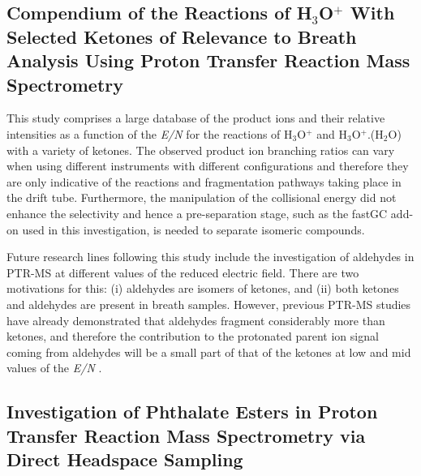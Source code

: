 \subsection{Compendium of the Reactions of H$_3$O$^+$ With Selected Ketones of Relevance
to Breath Analysis Using Proton Transfer Reaction Mass Spectrometry}

This study comprises a large database of the product ions and their relative intensities as a function of the \textit{E/N} for the reactions of H$_3$O$^+$ and H$_3$O$^+$.(H$_2$O) with a variety of ketones.
%
The observed product ion branching ratios can vary when using different instruments with different configurations and therefore they are only indicative of the reactions and fragmentation pathways taking place in the drift tube.
%
Furthermore, the manipulation of the collisional energy did not enhance the selectivity 
and hence a pre-separation stage, such as the fastGC add-on used in this investigation, is needed to separate isomeric compounds.

Future research lines following this study include the investigation of aldehydes in PTR-MS at different values of the reduced electric field.
%
There are two motivations for this: (i) aldehydes are isomers of ketones, and (ii) both ketones and aldehydes are present in breath samples.
%
However, previous PTR-MS studies have already demonstrated that aldehydes fragment considerably more than ketones, and therefore the contribution to the protonated parent ion signal coming from aldehydes will be a small part of that of the ketones at low and mid values of the \textit{E/N} \cite{buhr2002analysis,schwarz2009determining}.



\subsection{Investigation of Phthalate Esters in Proton Transfer Reaction Mass Spectrometry
via Direct Headspace Sampling}


